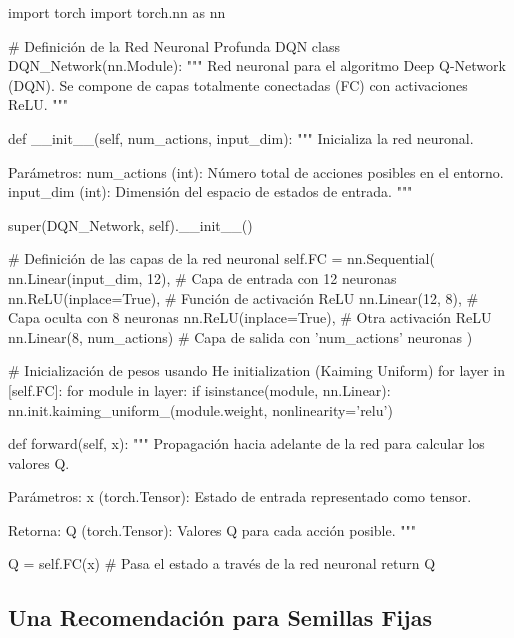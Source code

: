 \documentclass[a4paper, 11pt]{article}
\begin{document}
\begin{pyverbatim}[][frame=single, fontsize=\scriptsize]
import torch
import torch.nn as nn

# Definición de la Red Neuronal Profunda DQN
class DQN_Network(nn.Module):
    """
    Red neuronal para el algoritmo Deep Q-Network (DQN).
    Se compone de capas totalmente conectadas (FC) con activaciones ReLU.
    """
    
    def __init__(self, num_actions, input_dim):
        """
        Inicializa la red neuronal.
        
        Parámetros:
            num_actions (int): Número total de acciones posibles en el entorno.
            input_dim (int): Dimensión del espacio de estados de entrada.
        """
        
        super(DQN_Network, self).__init__()
        
        # Definición de las capas de la red neuronal
        self.FC = nn.Sequential(
            nn.Linear(input_dim, 12),  # Capa de entrada con 12 neuronas
            nn.ReLU(inplace=True),  # Función de activación ReLU
            nn.Linear(12, 8),  # Capa oculta con 8 neuronas
            nn.ReLU(inplace=True),  # Otra activación ReLU
            nn.Linear(8, num_actions)  # Capa de salida con 'num_actions' neuronas
        )
        
        # Inicialización de pesos usando He initialization (Kaiming Uniform)
        for layer in [self.FC]:
            for module in layer:
                if isinstance(module, nn.Linear):
                    nn.init.kaiming_uniform_(module.weight, nonlinearity='relu')
    
    def forward(self, x):
        """
        Propagación hacia adelante de la red para calcular los valores Q.
        
        Parámetros:
            x (torch.Tensor): Estado de entrada representado como tensor.
        
        Retorna:
            Q (torch.Tensor): Valores Q para cada acción posible.
        """
        
        Q = self.FC(x)  # Pasa el estado a través de la red neuronal
        return Q
\end{pyverbatim}      


\subsection{Una Recomendación para Semillas Fijas}
\end{document}
